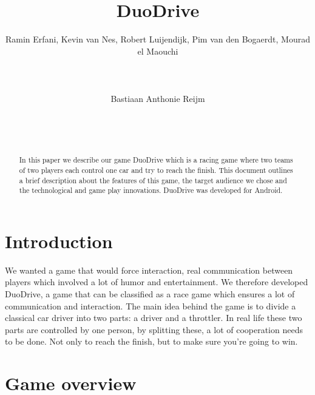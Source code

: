 \documentclass{sigchi}
\begin{document}
\title{DuoDrive}

\author{
  \alignauthor Ramin Erfani, Kevin van Nes, Robert Luijendijk, Pim van den Bogaerdt, Mourad el Maouchi\\
    \\
    \\
    \\
  \alignauthor Bastiaan Anthonie Reijm\\
    \\
    \\
    \\
}

\maketitle

\begin{abstract}
In this paper we describe our game DuoDrive
which is a racing game where two teams of
two players each control one car and try to
reach the finish. This document outlines a brief
description about the features of this game, the target
audience we chose and the technological and
game play innovations. DuoDrive was developed
for Android.
\end{abstract}


\section{Introduction}

We wanted a game that would force interaction, real communication between players which involved a lot of humor and entertainment. We therefore developed DuoDrive, a game that can be classified as a race game which ensures a lot of communication and interaction. The main idea behind the game is to divide a classical car driver into two parts: a driver and a throttler. In real life these two parts are controlled by one person, by splitting these, a lot of cooperation needs to be done. Not only to reach the finish, but to make sure you're going to win.

\section{Game overview}
\end{document}
